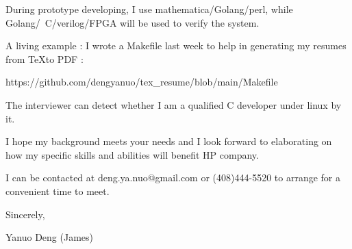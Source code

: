 { \bigbreak } 
During prototype developing, I use mathematica/Golang/perl, 
while Golang/~C/verilog/FPGA will be used to verify the system.

{ \bigbreak } 
A living example : I wrote a Makefile last week to help in generating my resumes from \TeX to PDF : 

\centerline{
https://github.com/dengyanuo/tex\_resume/blob/main/Makefile
}

The interviewer can detect whether I am a qualified C developer under linux by it.

{ \bigbreak } 
I hope my background meets your needs and I look
forward to elaborating on how my specific skills and abilities will benefit HP company.

{ \bigbreak } 
I can be contacted at deng.ya.nuo@gmail.com
or (408)444-5520 to arrange for a convenient time to meet.

{ \bigbreak } 




\vskip 60pt

{ \bigbreak } 
Sincerely,

Yanuo Deng (James)

\bye
